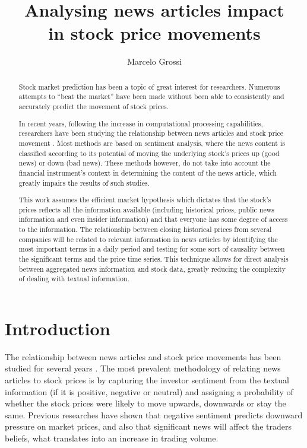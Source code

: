 \documentclass{article}
\title{Analysing news articles impact \\ in stock price movements}
\author{Marcelo Grossi}
\begin{document}
\maketitle

\begin{abstract}
Stock market prediction has been a topic of great interest for researchers. Numerous attempts to ``beat the market'' have been made without been able to consistently and accurately predict the movement of stock prices.

\par
In recent years, following the increase in computational processing capabilities, researchers have been studying the relationship between news articles and stock price movement \citep{Fu2008,Schumaker2009}. Most methods are based on sentiment analysis, where the news content is classified according to its potential of moving the underlying stock's prices up (good news) or down (bad news). These methods however, do not take into account the financial instrument's context in determining the content of the news article, which greatly impairs the results of such studies.

\par
This work assumes the efficient market hypothesis which dictates that the stock's prices reflects all the information available (including historical prices, public news information and even insider information) \citep{fama1965behavior} and that everyone has some degree of access to the information. The relationship between closing historical prices from several companies will be related to relevant information in news articles by identifying the most important terms in a daily period and testing for some sort of causality between the significant terms and the price time series. This technique allows for direct analysis between aggregated news information and stock data, greatly reducing the complexity of dealing with textual information.
\end{abstract}

\section{Introduction}
The relationship between news articles and stock price movements has been studied for several years \citep{gidofalvi2001,Fu2008}. The most prevalent methodology of relating news articles to stock prices is by capturing the investor sentiment \citep{Handbook} from the textual information (if it is positive, negative or neutral) and assigning a probability of whether the stock prices were likely to move upwards, downwards or stay the same. Previous researches \citep{Tetlock2007} have shown that negative sentiment predicts downward pressure on market prices, and also \citep{barber2008all} that significant news will affect the traders beliefs, what translates into an increase in trading volume.
\end{document}
